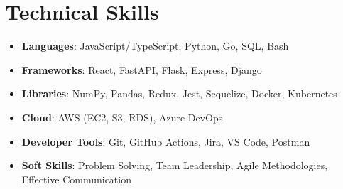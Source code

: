 \documentclass[letterpaper,10pt]{article}
\newcommand{\techSkillsItem}[2]{\item \small \textbf{#1}{: {#2}}}
\begin{document}
\section{Technical Skills}
\begin{itemize}[leftmargin=0.15in, label={}, nosep]
  \techSkillsItem{Languages}{JavaScript/TypeScript, Python, Go, SQL, Bash}
  \techSkillsItem{Frameworks}{React, FastAPI, Flask, Express, Django}
  \techSkillsItem{Libraries}{NumPy, Pandas, Redux, Jest, Sequelize, Docker, Kubernetes}
  \techSkillsItem{Cloud}{AWS (EC2, S3, RDS), Azure DevOps}
  \techSkillsItem{Developer Tools}{Git, GitHub Actions, Jira, VS Code, Postman}
  \techSkillsItem{Soft Skills}{Problem Solving, Team Leadership, Agile Methodologies, Effective Communication}
\end{itemize}
\end{document}
